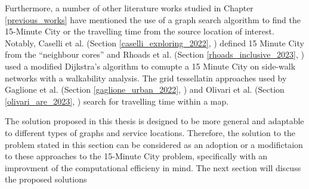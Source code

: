 Furthermore, a number of other literature works studied in Chapter \ref{previous_works} have mentioned the use of a graph search algorithm to find the 15-Minute City or the travelling time from the source location of interest. Notably, Caselli et al. (Section \ref{caselli_exploring_2022}, \cite{caselli_exploring_2022}) defined 15 Minute City from the ``neighbour cores'' and Rhoads et al. (Section \ref{rhoads_inclusive_2023}, \cite{rhoads_inclusive_2023}) used a modified Dijkstra's algorithm to comupte a 15 Minute City on side-walk networks with a walkability analysis. The grid tessellatin approaches used by Gaglione et al. (Section \ref{gaglione_urban_2022}, \cite{gaglione_urban_2022}) and Olivari et al. (Section \ref{olivari_are_2023}, \cite{olivari_are_2023}) search for travelling time within a map.

The solution proposed in this thesis is designed to be more general and adaptable to different types of graphs and service locations. Therefore, the solution to the problem stated in this section can be considered as an adoption or a modifictaion to these approaches to the 15-Minute City problem, specifically with an improvment of the computational efficieny in mind. The next section will discuss the proposed solutions
